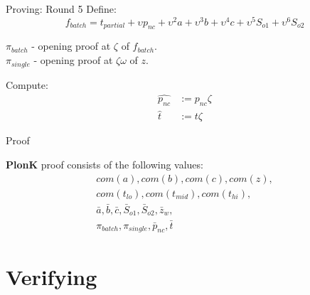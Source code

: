 \documentclass{zkdl-presentation-template}
\begin{document}
    \begin{frame} {Proving: Round 5}
        Define:
        \begin{equation*}
            f_{batch} = t_{partial} + \upsilon p_{nc} + \upsilon^2 a + \upsilon^3 b + \upsilon^4 c + \upsilon^5 S_{o1} + \upsilon^6 S_{o2}
        \end{equation*}

        \begin{definition}
            $\pi_{batch}$ - opening proof at $\zeta$ of $f_{batch}$. \\
            $\pi_{single}$ - opening proof at $\zeta\omega$ of $z$.
        \end{definition}

        Compute:
        \begin{align*}
            \hat{p_{nc}} &:= p_{nc}{\zeta} \\
            \hat{t} &:= t{\zeta}
        \end{align*}
    \end{frame}

    \begin{frame} {Proof}
        \begin{definition}
            \textbf{PlonK} proof consists of the following values:
            \begin{align*}
                com(a), com(b), com(c), com(z), \\ 
                com(t_{lo}), com(t_{mid}), com(t_{hi}), \\ 
                \bar{a}, \bar{b}, \bar{c}, \bar{S}_{o1}, \bar{S}_{o2}, \bar{z}_w, \\
                \pi_{batch}, \pi_{single}, \bar{p}_{nc}, \bar{t}
            \end{align*}
        \end{definition}
    \end{frame}

    \section{Verifying}
\end{document}
